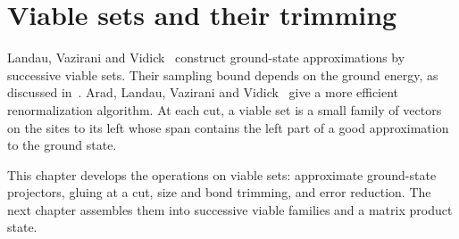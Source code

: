 \chapter{Viable sets and their trimming}
\label{ch:gapped_chain_algorithms}

Landau, Vazirani and Vidick~\cite{Landau2015Published} construct ground-state
approximations by successive viable sets. Their sampling bound depends on
the ground energy, as discussed in~\cite{gap:lvv13_runtime_ground_energy}.
Arad, Landau, Vazirani and Vidick~\cite{Arad2016RigorousRG} give a more
efficient renormalization algorithm. At each cut, a viable set is a small
family of vectors on the sites to its left whose span contains the left
part of a good approximation to the ground state.

This chapter develops the operations on viable sets: approximate
ground-state projectors, gluing at a cut, size and bond trimming, and error
reduction. The next chapter assembles them into successive viable families
and a matrix product state.











